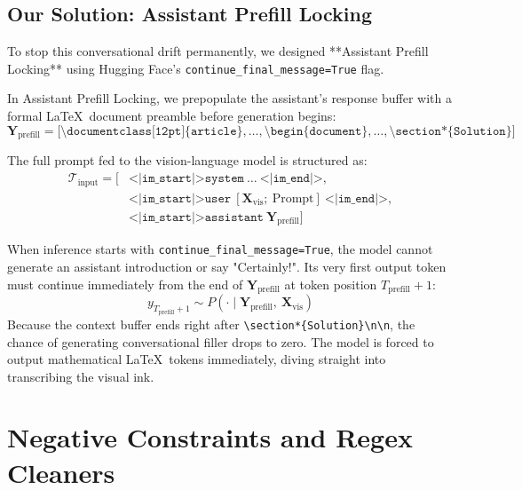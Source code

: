 \subsection{Our Solution: Assistant Prefill Locking}
To stop this conversational drift permanently, we designed **Assistant Prefill Locking** using Hugging Face's \texttt{continue\_final\_message=True} flag.

In Assistant Prefill Locking, we prepopulate the assistant's response buffer with a formal \LaTeX\ document preamble before generation begins:
\begin{equation}
\label{eq:prefill_string}
\mathbf{Y}_{\text{prefill}} = \big[ \texttt{\textbackslash documentclass[12pt]\{article\}}, \dots, \texttt{\textbackslash begin\{document\}}, \dots, \texttt{\textbackslash section*\{Solution\}} \big]
\end{equation}

The full prompt fed to the vision-language model is structured as:
\begin{equation}
\label{eq:prompt_structure}
\begin{aligned}
\mathcal{T}_{\text{input}} = \big[ &\texttt{<|im\_start|>system} \ \dots \ \texttt{<|im\_end|>}, \\
&\texttt{<|im\_start|>user} \ [\mathbf{X}_{\text{vis}}; \ \text{Prompt}] \ \texttt{<|im\_end|>}, \\
&\texttt{<|im\_start|>assistant} \ \mathbf{Y}_{\text{prefill}} \big]
\end{aligned}
\end{equation}

When inference starts with \texttt{continue\_final\_message=True}, the model cannot generate an assistant introduction or say "Certainly!". Its very first output token must continue immediately from the end of $\mathbf{Y}_{\text{prefill}}$ at token position $T_{\text{prefill}} + 1$:
\begin{equation}
y_{T_{\text{prefill}} + 1} \sim P\left( \cdot \mid \mathbf{Y}_{\text{prefill}}, \ \mathbf{X}_{\text{vis}} \right)
\end{equation}
Because the context buffer ends right after \texttt{\textbackslash section*\{Solution\}\textbackslash n\textbackslash n}, the chance of generating conversational filler drops to zero. The model is forced to output mathematical \LaTeX\ tokens immediately, diving straight into transcribing the visual ink.

\section{Negative Constraints and Regex Cleaners}
\label{sec:negative_constraints}

